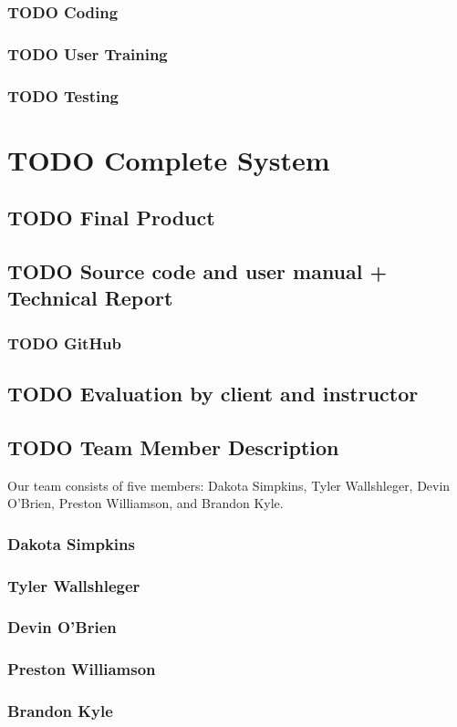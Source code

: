 \documentclass[11pt]{article}
\begin{document}
\subsubsection{{\bfseries\sffamily TODO} Coding}
\label{sec:org0a4c573}
\subsubsection{{\bfseries\sffamily TODO} User Training}
\label{sec:org6728850}
\subsubsection{{\bfseries\sffamily TODO} Testing}
\label{sec:orgbda6f6b}
\section{{\bfseries\sffamily TODO} Complete System}
\label{sec:org5662fd1}
\subsection{{\bfseries\sffamily TODO} Final Product}
\label{sec:orge13a449}
\subsection{{\bfseries\sffamily TODO} Source code and user manual + Technical Report}
\label{sec:org258ab83}
\subsubsection{{\bfseries\sffamily TODO} GitHub}
\label{sec:org2167192}
\subsection{{\bfseries\sffamily TODO} Evaluation by client and instructor}
\label{sec:org2e92f94}

\subsection{{\bfseries\sffamily TODO} Team Member Description}
\label{sec:org607f4f1}
Our team consists of five members: Dakota Simpkins, Tyler Wallshleger,
Devin O'Brien, Preston Williamson, and Brandon Kyle.
\subsubsection{Dakota Simpkins}
\label{sec:org46555fc}
\subsubsection{Tyler Wallshleger}
\label{sec:orgaa9dcdc}
\subsubsection{Devin O'Brien}
\label{sec:org59815cb}
\subsubsection{Preston Williamson}
\label{sec:org235f7c8}
\subsubsection{Brandon Kyle}
\label{sec:org8530033}
\end{document}
